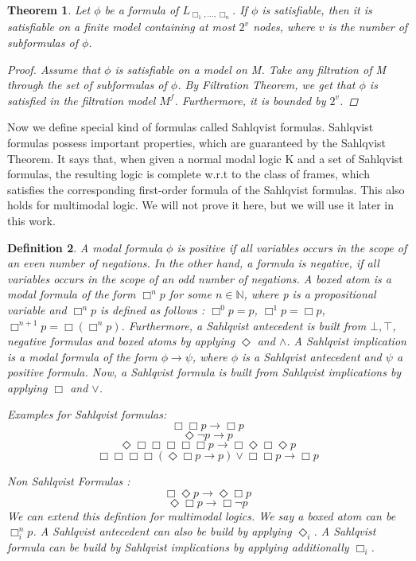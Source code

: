 \documentclass[12pt, a4paper]{scrartcl}
\newtheorem{definition}{Definition}[subsection]
\newtheorem{theorem}[definition]{Theorem}
\begin{document}
\begin{theorem}
    Let $\phi$ be a formula of $L_{\Box_1,...,\Box_n}$. If $\phi$ is satisfiable, then it is satisfiable on a finite model containing at most $2^v$ nodes, where $v$ is the number of subformulas of $\phi$.

    \begin{proof}
    Assume that $\phi$ is satisfiable on a model on M. Take any filtration of M through the set of subformulas of $\phi$. 
    By Filtration Theorem, we get that $\phi$ is satisfied in the filtration model $M^f$. Furthermore, it is bounded by $2^v$.
    
    \end{proof}
        
\end{theorem}
    Now we define special kind of formulas called Sahlqvist formulas.
    Sahlqvist formulas possess important properties, which are guaranteed by the Sahlqvist Theorem. It says that, when given a normal modal logic K and a set of Sahlqvist formulas, the resulting logic is complete w.r.t 
    to the class of frames, which satisfies the corresponding first-order formula of the Sahlqvist formulas. This also holds for multimodal logic. We will not prove it here, but we will use it later in this work.

\begin{definition}
    A modal formula $\phi$ is positive if all variables occurs in the scope of an even number of negations. In the other hand, a formula is negative, if all variables occurs in the scope of an odd number of negations.
    A boxed atom is a modal formula of the form $\Box^n p$ for some $n \in \mathbb{N}$, where p is a propositional variable and $\Box^n p$ is defined as follows :
    $\Box^0 p = p$, $\Box^1 p = \Box p$, $\Box^{n+1} p = \Box(\Box^n p)$. \newline \newline
    Furthermore, a Sahlqvist antecedent is built from $\bot, \top$, negative formulas and boxed atoms by applying $\Diamond$ and $\land$. A Sahlqvist implication is a modal formula of the form
    $\phi \rightarrow \psi$, where $\phi$ is a Sahlqvist antecedent and $\psi$ a positive formula. \newline
    Now, a Sahlqvist formula is built from Sahlqvist implications by applying $\Box$ and $\lor$. \newline
    
    Examples for Sahlqvist formulas: 
    $$\Box \Box p \rightarrow \Box p$$
    $$ \Diamond \neg p\rightarrow p$$
    $$ \Diamond \Box \Box \Box \Box \Box p\rightarrow \Box \Diamond \Box \Diamond p$$
    $$ \Box\Box\Box\Box(\Diamond \Box p\rightarrow p) \lor \Box \Box p \rightarrow \Box p $$
    
    Non Sahlqvist Formulas :
    $$\Box \Diamond p \rightarrow \Diamond \Box p$$
    $$\Diamond \Box p \rightarrow \Box \neg p$$ \newline
    We can extend this defintion for multimodal logics. We say a boxed atom can be $\Box^n_i p$. A Sahlqvist antecedent
    can also be build by applying $\Diamond_i$. A Sahlqvist formula can be build by
    Sahlqvist implications by applying additionally $\Box_i$.
\end{definition}
\end{document}
